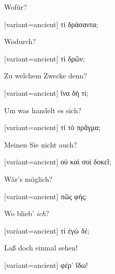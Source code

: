 Wofür?

\switchcolumn

\begin{greek}[variant=ancient]%
τί δράσαντα;

\end{greek}%
\switchcolumn*

Wodurch?

\switchcolumn

\begin{greek}[variant=ancient]%
τί δρῶν;

\end{greek}%
\switchcolumn*

Zu welchem Zwecke denn?

\switchcolumn

\begin{greek}[variant=ancient]%
ἵνα δὴ τί;

\end{greek}%
\switchcolumn*

Um was handelt es sich?

\switchcolumn

\begin{greek}[variant=ancient]%
τί τὸ πρᾶγμα;

\end{greek}%
\switchcolumn*

Meinen Sie nicht auch?

\switchcolumn

\begin{greek}[variant=ancient]%
οὐ καὶ σοὶ δοκεῖ;

\end{greek}%
\switchcolumn*

Wär's möglich?

\switchcolumn

\begin{greek}[variant=ancient]%
πῶς φής;

\end{greek}%
\switchcolumn*

Wo blieb' \emph{ich}?

\switchcolumn

\begin{greek}[variant=ancient]%
τί ἐγὼ δέ;

\end{greek}%
\switchcolumn*

Laß doch einmal sehen!

\switchcolumn

\begin{greek}[variant=ancient]%
φέρ' ἴδω!

\end{greek}%
\switchcolumn*

